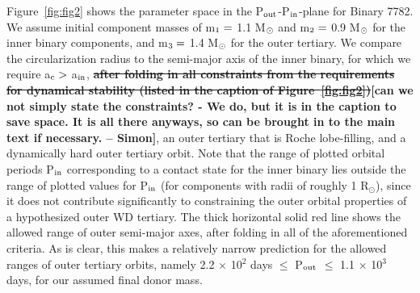 \documentclass{aastex62}
\def\simon#1{{\bf {\color{red}[#1 -- Simon]}}}
\def\del#1{{\bf {\sout{#1}}}}
\begin{document}
Figure~\ref{fig:fig2} shows the parameter space in the P$_{\rm
  out}$-P$_{\rm in}$-plane for Binary 7782.  We assume initial
component masses of m$_{\rm 1} =$ 1.1 M$_{\rm \odot}$ and m$_{\rm 2}
=$ 0.9 M$_{\rm \odot}$ for the inner binary components, and m$_{\rm 3}
=$ 1.4 M$_{\rm \odot}$ for the outer tertiary.  We compare the
circularization radius to the semi-major axis of the inner binary, for
which we require a$_{\rm c} >$ a$_{\rm in}$, \del{after folding in all
  constraints from the requirements for dynamical stability (listed in the caption of Figure~\ref{fig:fig2})}\simon{can
  we not simply state the constraints? - We do, but it is in the caption to save space.  It is all there anyways, so can be brought in to the main text if necessary.}, an outer tertiary that is
Roche lobe-filling, and a dynamically hard outer tertiary orbit.  Note
that the range of plotted orbital periods P$_{\rm in}$ corresponding
to a contact state for the inner binary lies outside the
range of plotted values for P$_{\rm in}$ (for components with radii of roughly 1 R$_{\odot}$), since it does not contribute
significantly to constraining the outer orbital properties of a
hypothesized outer WD tertiary.  The thick horizontal solid red line
shows the allowed range of outer semi-major axes, after folding in all
of the aforementioned criteria.  As is clear, this makes a relatively
narrow prediction for the allowed ranges of outer tertiary orbits,
namely 2.2 $\times$ 10$^{2}$ days $\le$ P$_{\rm out}$ $\le$ 1.1
$\times$ 10$^3$ days, for our assumed final donor mass.
\end{document}
